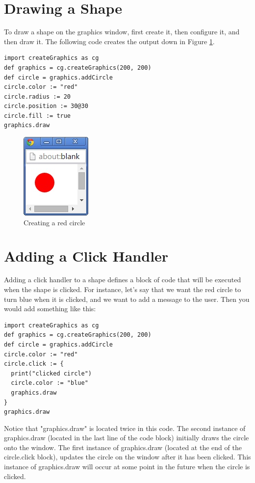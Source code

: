 \documentclass{article}
\begin{document}
\section{Drawing a Shape}
To draw a shape on the graphics window, first create it, then configure it, and then draw it. The following code
creates the output down in Figure \ref{fig:red_circle}.
\begin{lstlisting}
import createGraphics as cg
def graphics = cg.createGraphics(200, 200)
def circle = graphics.addCircle
circle.color := "red"
circle.radius := 20
circle.position := 30@30
circle.fill := true
graphics.draw
\end{lstlisting}

\begin{figure}[h]
\includegraphics{red_circle}
\centering
\caption{Creating a red circle}
\label{fig:red_circle}
\end{figure}

\section{Adding a Click Handler}
Adding a click handler to a shape defines a block of code that will be executed when the shape is clicked. For instance,
let's say that we want the red circle to turn blue when it is clicked, and we want to add a message to the user. 
Then you would add something like this:
\begin{lstlisting}
import createGraphics as cg
def graphics = cg.createGraphics(200, 200)
def circle = graphics.addCircle
circle.color := "red"
circle.click := { 
  print("clicked circle") 
  circle.color := "blue"
  graphics.draw
}
graphics.draw
\end{lstlisting}
Notice that "graphics.draw" is located twice in this code. The second instance of graphics.draw (located in the last line
of the code block) initially draws the circle onto the window. The first instance of graphics.draw (located at the end of the circle.click block),
updates the circle on the window after it has been clicked. This instance of graphics.draw will occur at some point in the future when
the circle is clicked.
\end{document}

